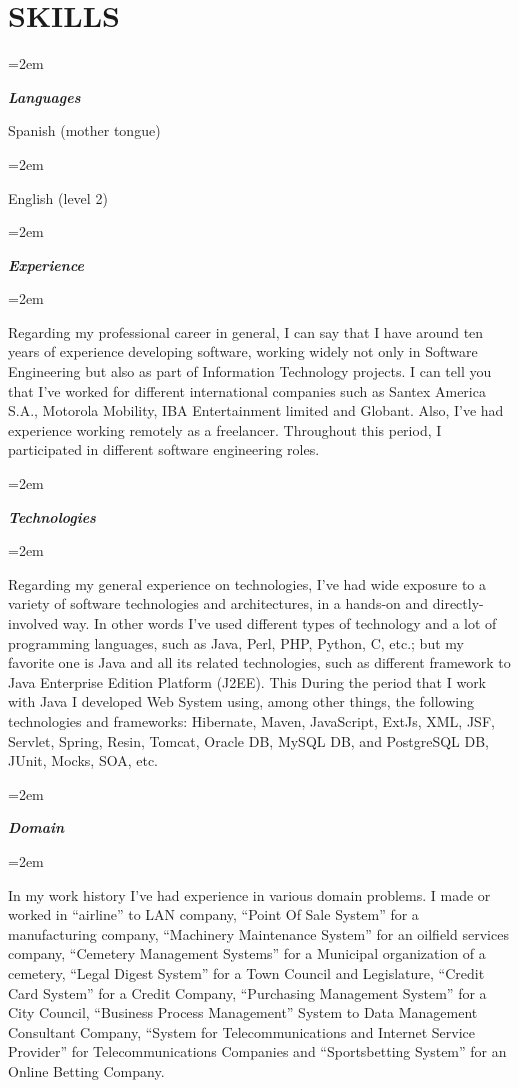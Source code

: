 \documentclass[paper=a4,fontsize=11pt]{scrartcl} %
\newlength{\spacebox}
\newcommand{\sepspace}{\vspace*{1em}}		%
\newcommand{\NewPart}[1]{\section*{\uppercase{#1}}}
\newcommand{\PersonalEntry}[2]{
		\noindent\hangindent=2em\hangafter=0 %
		\parbox{\spacebox}{        %
		\textit{#1}}		       %
		\hspace{1.5em} #2 \par}    %
\newcommand{\SkillsEntry}[2]{      %
		\noindent\hangindent=2em\hangafter=0 %
		\parbox{\spacebox}{        %
		\textit{#1}}			   %
		\hspace{1.5em} #2 \par}    %
\begin{document}
\NewPart{Skills}{}

\SkillsEntry{\large{\textbf{Languages}}}{Spanish (mother tongue)}

\SkillsEntry{}{English (level 2)}

\sepspace

\sepspace

\SkillsEntry{\large{\textbf{Experience}}}{}
\SkillsEntry{}{
Regarding my professional career in general, I can say that I have around ten years of experience developing software, working widely not only in Software Engineering but also as part of Information Technology projects. I can tell you that I've worked for different international companies such as Santex America S.A., Motorola Mobility, IBA Entertainment limited and Globant. Also, I've had experience working remotely as a freelancer. Throughout this period, I participated in different software engineering roles. 
}

\sepspace

\SkillsEntry{\large{\textbf{Technologies}}}{}
\SkillsEntry{}{
Regarding my general experience on technologies, I've had wide exposure to a variety of software technologies and architectures, in a hands-on and directly-involved way. In other words I've used different types of technology and a lot of programming languages, such as Java, Perl, PHP, Python, C, etc.; but my favorite one is Java and all its related technologies, such as different framework to Java Enterprise Edition Platform (J2EE). This During the period that I work with Java I developed Web System using, among other things, the following technologies and frameworks: Hibernate, Maven, JavaScript, ExtJs, XML, JSF, Servlet, Spring, Resin, Tomcat, Oracle DB, MySQL DB, and PostgreSQL DB, JUnit, Mocks, SOA, etc.
}

\sepspace

\SkillsEntry{\large{\textbf{Domain}}}{}
\SkillsEntry{}{
	In my work history I've had experience in various domain problems. I made or worked in “airline” to LAN company, “Point Of Sale System” for a manufacturing company, “Machinery Maintenance System” for an oilfield services company, “Cemetery Management Systems” for a Municipal organization of a cemetery, “Legal Digest System” for a Town Council and Legislature, “Credit Card System” for a Credit Company, “Purchasing Management System” for a City Council,  “Business Process Management” System to Data Management Consultant Company, “System for Telecommunications and Internet Service Provider” for Telecommunications Companies and “Sportsbetting System” for an Online Betting Company.
}
\end{document}
